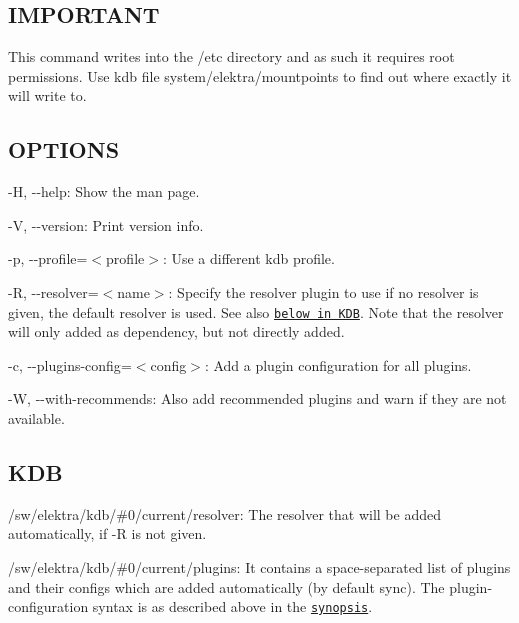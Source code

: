 \subsection*{I\+M\+P\+O\+R\+T\+A\+N\+T}

This command writes into the {\ttfamily /etc} directory and as such it requires root permissions. Use {\ttfamily kdb file system/elektra/mountpoints} to find out where exactly it will write to.

\subsection*{O\+P\+T\+I\+O\+N\+S}


\begin{DoxyItemize}
\item {\ttfamily -\/\+H}, {\ttfamily -\/-\/help}\+: Show the man page.
\item {\ttfamily -\/\+V}, {\ttfamily -\/-\/version}\+: Print version info.
\item {\ttfamily -\/p}, {\ttfamily -\/-\/profile}=$<$profile$>$\+: Use a different kdb profile.
\item {\ttfamily -\/\+R}, {\ttfamily -\/-\/resolver}=$<$name$>$\+: Specify the resolver plugin to use if no resolver is given, the default resolver is used. See also \href{#KDB}{\tt below in K\+D\+B}. Note that the resolver will only added as dependency, but not directly added.
\item {\ttfamily -\/c}, {\ttfamily -\/-\/plugins-\/config}=$<$config$>$\+: Add a plugin configuration for all plugins.
\item {\ttfamily -\/\+W}, {\ttfamily -\/-\/with-\/recommends}\+: Also add recommended plugins and warn if they are not available.
\end{DoxyItemize}

\subsection*{K\+D\+B}


\begin{DoxyItemize}
\item {\ttfamily /sw/elektra/kdb/\#0/current/resolver}\+: The resolver that will be added automatically, if {\ttfamily -\/\+R} is not given.
\item {\ttfamily /sw/elektra/kdb/\#0/current/plugins}\+: It contains a space-\/separated list of plugins and their configs which are added automatically (by default sync). The plugin-\/configuration syntax is as described above in the \href{#SYNOPSIS}{\tt synopsis}.
\end{DoxyItemize}

